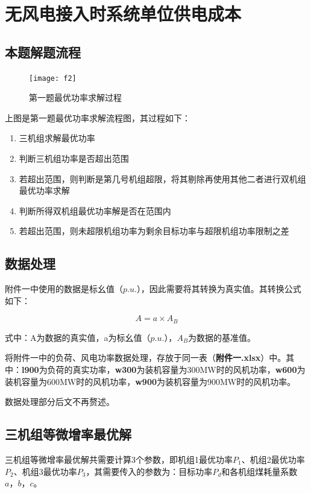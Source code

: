\documentclass{cumcmthesis}
\begin{document}
  \section{无风电接入时系统单位供电成本}
  \subsection{本题解题流程}\label{l}
  \begin{figure}[H]
  	\centering
  	\texttt{[image: f2]}
  	\caption{第一题最优功率求解过程}
  	\label{fig:circuit-diagram}
  \end{figure}
  
  上图是第一题最优功率求解流程图，其过程如下：
  
  \begin{enumerate}
  	\item 三机组求解最优功率
  	\item 判断三机组功率是否超出范围
  	\item 若超出范围，则判断是第几号机组超限，将其剔除再使用其他二者进行双机组最优功率求解
  	\item 判断所得双机组最优功率解是否在范围内
  	\item 若超出范围，则未超限机组功率为剩余目标功率与超限机组功率限制之差
  \end{enumerate}
  \subsection{数据处理}\label{数据处理}
  附件一中使用的数据是标幺值（$ p.u. $），因此需要将其转换为真实值。其转换公式如下：
  
  \begin{equation}\label{key}
  		A=a\times A_{B}
  \end{equation}
  
  式中：A为数据的真实值，a为标幺值（$ p.u. $），$ A_{B} $为数据的基准值。
  
  将附件一中的负荷、风电功率数据处理，存放于同一表（\textbf{附件一.xlsx}）中。其中：\textbf{l900}为负荷的真实功率，\textbf{w300}为装机容量为300MW时的风机功率，\textbf{w600}为装机容量为600MW时的风机功率，\textbf{w900}为装机容量为900MW时的风机功率。
  
  数据处理部分后文不再赘述。
  \subsection{三机组等微增率最优解}\label{equalIR3}
  三机组等微增率最优解共需要计算3个参数，即机组1最优功率$ P_{1} $、机组2最优功率$ P_{2} $、机组3最优功率$ P_{3} $，其需要传入的参数为：目标功率$ P_{d} $和各机组煤耗量系数$ a\texttt{，}b\texttt{，}c $。
  
\end{document}
